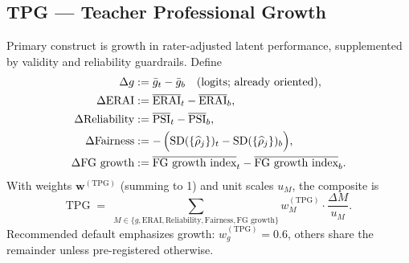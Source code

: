 \documentclass[11pt]{article}
\newcommand{\TPG}{\mathrm{TPG}}
\newcommand{\ERAI}{\mathrm{ERAI}}
\newcommand{\PSI}{\mathrm{PSI}}
\begin{document}
\subsection{TPG — Teacher Professional Growth}
Primary construct is growth in rater-adjusted latent performance, supplemented by validity and reliability guardrails. Define
\begin{align}
\Delta g &:= \bar{g}_{t} - \bar{g}_{b} \quad \text{(logits; already oriented)} ,\\
\Delta \ERAI &:= \overline{\ERAI}_{t} - \overline{\ERAI}_{b},\\
\Delta \text{Reliability} &:= \overline{\PSI}_{t} - \overline{\PSI}_{b},\\
\Delta \text{Fairness} &:= -\,\Bigl(\mathrm{SD}(\{\widehat{\rho}_j\})_{t} - \mathrm{SD}(\{\widehat{\rho}_j\})_{b}\Bigr),\\
\Delta \text{FG growth} &:= \overline{\text{FG growth index}}_{t} - \overline{\text{FG growth index}}_{b}.
\end{align}
With weights $\bm{w}^{(\TPG)}$ (summing to 1) and unit scales $u_M$, the composite is
\begin{equation}
\TPG \;=\; \sum_{M \in \{g,\ERAI,\text{Reliability},\text{Fairness},\text{FG growth}\}} w^{(\TPG)}_M \cdot \frac{\Delta M}{u_M} .
\end{equation}
Recommended default emphasizes growth: $w^{(\TPG)}_g=0.6$, others share the remainder unless pre-registered otherwise.
\end{document}
